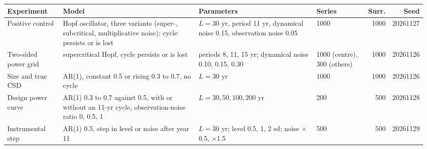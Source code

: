 \begin{tabular}{p{1.8cm}p{3.3cm}p{3.5cm}p{1.5cm}rr}
\hline
Experiment & Model & Parameters & Series & Surr. & Seed \\
\hline
Positive control & Hopf oscillator, three variants (super-, subcritical, multiplicative noise); cycle persists or is lost & $L=30$ yr, period 11 yr, dynamical noise 0.15, observation noise 0.05 & 1000 & 1000 & 20261127 \\
Two-sided power grid & supercritical Hopf, cycle persists or is lost & periods 8, 11, 15 yr; dynamical noise 0.10, 0.15, 0.30 & 1000 (centre), 300 (others) & 1000 & 20261126 \\
Size and true CSD & AR(1), constant 0.5 or rising 0.3 to 0.7, no cycle & $L=30$ yr & 1000 & 1000 & 20261126 \\
Design power curve & AR(1) 0.3 to 0.7 against 0.5, with or without an 11-yr cycle, observation-noise ratio 0, 0.5, 1 & $L = 30, 50, 100, 200$ yr & 200 & 500 & 20261128 \\
Instrumental step & AR(1) 0.5, step in level or noise after year 11 & $L=30$ yr; level 0.5, 1, 2 sd; noise $\times$0.5, $\times$1.5 & 500 & 500 & 20261129 \\
\hline
\end{tabular}

